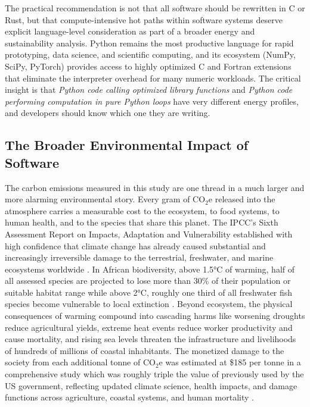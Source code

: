 The practical recommendation is not that all software should be rewritten in C or Rust, but that compute-intensive hot paths within software systems deserve explicit language-level consideration as part of a broader energy and sustainability analysis. Python remains the most productive language for rapid prototyping, data science, and scientific computing, and its ecosystem (NumPy, SciPy, PyTorch) provides access to highly optimized C and Fortran extensions that eliminate the interpreter overhead for many numeric workloads. The critical insight is that \textit{Python code calling optimized library functions} and \textit{Python code performing computation in pure Python loops} have very different energy profiles, and developers should know which one they are writing.
 

\subsection{The Broader Environmental Impact of Software}
The carbon emissions measured in this study are one thread in a much larger and more alarming environmental story. Every gram of CO$_2$e released into the atmosphere carries a measurable cost to the ecosystem, to food systems, to human health, and to the species that share this planet. The IPCC's Sixth Assessment Report on Impacts, Adaptation and Vulnerability established with high confidence that climate change has already caused substantial and increasingly irreversible damage to the terrestrial, freshwater, and marine ecosystems worldwide \cite{ipcc2014lifecycle}. In African biodiversity, above 1.5°C of warming, half of all assessed species are projected to lose more than 30\% of their population or suitable habitat range while above 2°C, roughly one third of all freshwater fish species become vulnerable to local extinction \cite{ipccch9adaptation_vulnerability}. Beyond ecosystem, the physical consequences of warming compound into cascading harms like worsening droughts reduce agricultural yields, extreme heat events reduce worker productivity and cause mortality, and rising sea levels threaten the infrastructure and livelihoods of hundreds of millions of coastal inhabitants. The monetized damage to the society from each additional tonne of CO$_2$e was estimated at \$185 per tonne in a comprehensive study which was roughly triple the value of previously used by the US government, reflecting updated climate science, health impacts, and damage functions across agriculture, coastal systems, and human mortality \cite{evidence_of_higher_cost}.

